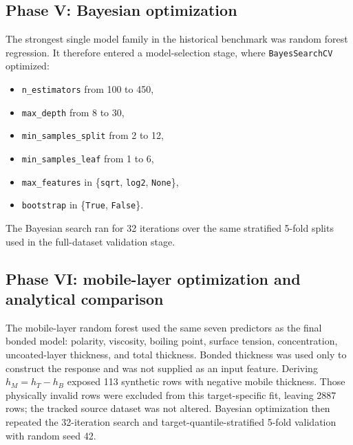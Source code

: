 \documentclass[11pt]{article}
\begin{document}
\subsection{Phase V: Bayesian optimization}
The strongest single model family in the historical benchmark was random forest regression. It therefore entered a model-selection stage, where \texttt{BayesSearchCV} optimized:
\begin{itemize}
    \item \texttt{n\_estimators} from 100 to 450,
    \item \texttt{max\_depth} from 8 to 30,
    \item \texttt{min\_samples\_split} from 2 to 12,
    \item \texttt{min\_samples\_leaf} from 1 to 6,
    \item \texttt{max\_features} in \{\texttt{sqrt}, \texttt{log2}, \texttt{None}\},
    \item \texttt{bootstrap} in \{\texttt{True}, \texttt{False}\}.
\end{itemize}

The Bayesian search ran for 32 iterations over the same stratified 5-fold splits used in the full-dataset validation stage.

\subsection{Phase VI: mobile-layer optimization and analytical comparison}
The mobile-layer random forest used the same seven predictors as the final bonded model: polarity, viscosity, boiling point, surface tension, concentration, uncoated-layer thickness, and total thickness. Bonded thickness was used only to construct the response and was not supplied as an input feature. Deriving $h_M=h_T-h_B$ exposed 113 synthetic rows with negative mobile thickness. Those physically invalid rows were excluded from this target-specific fit, leaving 2887 rows; the tracked source dataset was not altered. Bayesian optimization then repeated the 32-iteration search and target-quantile-stratified 5-fold validation with random seed 42.
\end{document}
